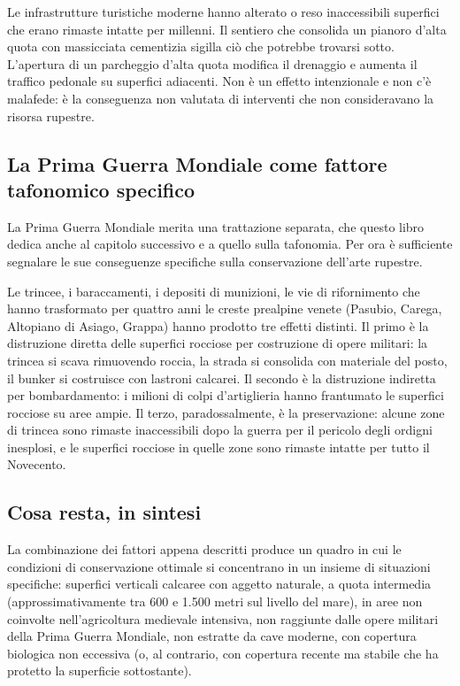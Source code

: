 Le infrastrutture turistiche moderne hanno alterato o reso inaccessibili superfici che erano rimaste intatte per millenni. Il sentiero che consolida un pianoro d'alta quota con massicciata cementizia sigilla ciò che potrebbe trovarsi sotto. L'apertura di un parcheggio d'alta quota modifica il drenaggio e aumenta il traffico pedonale su superfici adiacenti. Non è un effetto intenzionale e non c'è malafede: è la conseguenza non valutata di interventi che non consideravano la risorsa rupestre.

\subsection{La Prima Guerra Mondiale come fattore tafonomico specifico}

La Prima Guerra Mondiale merita una trattazione separata, che questo libro dedica anche al capitolo successivo e a quello sulla tafonomia. Per ora è sufficiente segnalare le sue conseguenze specifiche sulla conservazione dell'arte rupestre.

Le trincee, i baraccamenti, i depositi di munizioni, le vie di rifornimento che hanno trasformato per quattro anni le creste prealpine venete (Pasubio, Carega, Altopiano di Asiago, Grappa) hanno prodotto tre effetti distinti. Il primo è la distruzione diretta delle superfici rocciose per costruzione di opere militari: la trincea si scava rimuovendo roccia, la strada si consolida con materiale del posto, il bunker si costruisce con lastroni calcarei. Il secondo è la distruzione indiretta per bombardamento: i milioni di colpi d'artiglieria hanno frantumato le superfici rocciose su aree ampie. Il terzo, paradossalmente, è la preservazione: alcune zone di trincea sono rimaste inaccessibili dopo la guerra per il pericolo degli ordigni inesplosi, e le superfici rocciose in quelle zone sono rimaste intatte per tutto il Novecento.

\subsection{Cosa resta, in sintesi}

La combinazione dei fattori appena descritti produce un quadro in cui le condizioni di conservazione ottimale si concentrano in un insieme di situazioni specifiche: superfici verticali calcaree con aggetto naturale, a quota intermedia (approssimativamente tra 600 e 1.500 metri sul livello del mare), in aree non coinvolte nell'agricoltura medievale intensiva, non raggiunte dalle opere militari della Prima Guerra Mondiale, non estratte da cave moderne, con copertura biologica non eccessiva (o, al contrario, con copertura recente ma stabile che ha protetto la superficie sottostante).

